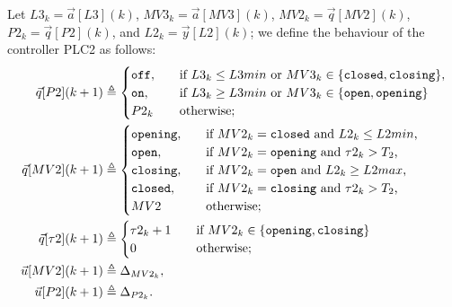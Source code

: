 {{Let $L3_k=\vec{a}[L3](k)$, $MV3_k=\vec{a}[MV3](k)$, $MV2_k=\vec{q}[MV2](k)$, $P2_k=\vec{q}[P2](k)$, and $L2_k=\vec{y}[L2](k)$; we define the behaviour of the controller PLC2 as follows:
\begin{align}
\vec{q}[P2](k+1)&\triangleq
    \begin{cases}
      \texttt{off},&\quad \text{if $L3_k\leq L3min$ or $MV3_k\in \set{\texttt{closed},\texttt{closing}}$},\\
      \texttt{on},&\quad \text{if $L3_k \geq L3min$ or $MV3_k\in \set{\texttt{open},\texttt{opening}}$}\\
      P2_k&\quad \text{otherwise;}
    \end{cases}\\
\vec{q}[MV2](k+1)&\triangleq
  \begin{cases}
    \texttt{opening},&\quad \text{if $MV2_k=\texttt{closed}$ and $L2_k\leq L2min$,}\\
    \texttt{open},&\quad \text{if $MV2_k=\texttt{opening}$ and $\tau2_k>T_2$,}\\
    \texttt{closing},&\quad \text{if $MV2_k=\texttt{open}$ and $L2_k\geq L2max$,}\\
    \texttt{closed},&\quad \text{if $MV2_k=\texttt{closing}$ and $\tau2_k>T_2$,}\\
    MV2&\quad \text{otherwise;}    
  \end{cases}\\
\vec{q}[\tau2](k+1)&\triangleq
\begin{cases}
  \tau2_k+1 &\quad \text{if $MV2_k\in \set{\texttt{opening},\texttt{closing}}$}\\
  0&\quad \text{otherwise;}    
\end{cases}\\
\vec{u}[MV2](k+1)&\triangleq\const_{MV2_k},\\%
\vec{u}[P2](k+1)&\triangleq\const_{P2_k}.%
\end{align}
}}
